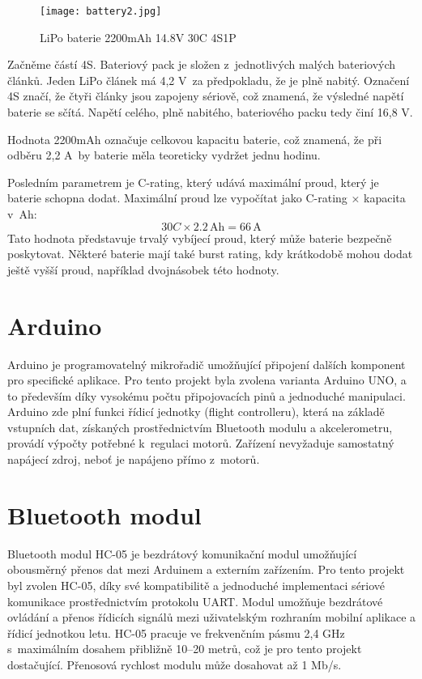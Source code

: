 \documentclass[12pt]{report}
\begin{document}
\begin{figure}[H]
	\centering
	\texttt{[image: battery2.jpg]}
	\caption{LiPo baterie 2200mAh 14.8V 30C 4S1P}
	\label{fig:battery2.jpg}
\end{figure}

Začněme částí 4S. Bateriový pack je složen z~jednotlivých malých bateriových článků. Jeden LiPo článek má 4,2 V~za předpokladu, že je plně nabitý. Označení 4S značí, že čtyři články jsou zapojeny sériově, což znamená, že výsledné napětí baterie se sčítá. Napětí celého, plně nabitého, bateriového packu tedy činí 16,8 V.

Hodnota 2200mAh označuje celkovou kapacitu baterie, což znamená, že při odběru 2,2 A~by baterie měla teoreticky vydržet jednu hodinu.

Posledním parametrem je C-rating, který udává maximální proud, který je baterie schopna dodat. Maximální proud lze vypočítat jako C-rating × kapacita v~Ah:
\[
30C \times 2.2\,\text{Ah} = 66\,\text{A}
\]
Tato hodnota představuje trvalý vybíjecí proud, který může baterie bezpečně poskytovat. Některé baterie mají také burst rating, kdy krátkodobě mohou dodat ještě vyšší proud, například dvojnásobek této hodnoty.

\section[Arduino]{Arduino}
Arduino je programovatelný mikrořadič umožňující připojení dalších komponent pro specifické aplikace. Pro tento projekt byla zvolena varianta Arduino UNO, a to především díky vysokému počtu připojovacích pinů a jednoduché manipulaci. Arduino zde plní funkci řídicí jednotky (flight controlleru), která na základě vstupních dat, získaných prostřednictvím Bluetooth modulu a akcelerometru, provádí výpočty potřebné k~regulaci motorů. Zařízení nevyžaduje samostatný napájecí zdroj, neboť je napájeno přímo z~motorů.

\section[Bluetooth modul]{Bluetooth modul}
Bluetooth modul HC-05 je bezdrátový komunikační modul umožňující obousměrný přenos dat mezi Arduinem a externím zařízením. Pro tento projekt byl zvolen HC-05, díky své kompatibilitě a jednoduché implementaci sériové komunikace prostřednictvím protokolu UART. Modul umožňuje bezdrátové ovládání a přenos řídicích signálů mezi uživatelským rozhraním mobilní aplikace a řídicí jednotkou letu. HC-05 pracuje ve frekvenčním pásmu 2,4 GHz s~maximálním dosahem přibližně 10–20 metrů, což je pro tento projekt dostačující. Přenosová rychlost modulu může dosahovat až 1 Mb/s. 
\end{document}
